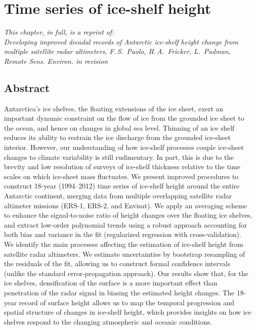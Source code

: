 %
%

\chapter{Time series of ice-shelf height}

{\sl
\noindent
This chapter, in full, is a reprint of:\\
Developing improved decadal records of Antarctic ice-shelf height change from multiple satellite radar altimeters, F.\,S.~Paolo, H.\,A.~Fricker, L.~Padman, {\rm Remote Sens. Environ.} in revision 
}


\section{Abstract}

Antarctica's ice shelves, the floating extensions of the ice sheet, exert an important dynamic constraint on the flow of ice from the grounded ice sheet to the ocean, and hence on changes in global sea level. Thinning of an ice shelf reduces its ability to restrain the ice discharge from the grounded ice-sheet interior. However, our understanding of how ice-shelf processes couple ice-sheet changes to climate variability is still rudimentary. In part, this is due to the brevity and low resolution of surveys of ice-shelf thickness relative to the time scales on which ice-sheet mass fluctuates. We present improved procedures to construct 18-year (1994--2012) time series of ice-shelf height around the entire Antarctic continent, merging data from multiple overlapping satellite radar altimeter missions (ERS-1, ERS-2, and Envisat). We apply an averaging scheme to enhance the signal-to-noise ratio of height changes over the floating ice shelves, and extract low-order polynomial trends using a robust approach accounting for both bias and variance in the fit (regularized regression with cross-validation). We identify the main processes affecting the estimation of ice-shelf height from satellite radar altimeters. We estimate uncertainties by bootstrap resampling of the residuals of the fit, allowing us to construct formal confidence intervals (unlike the standard error-propagation approach). Our results show that, for the ice shelves, densification of the surface is a more important effect than penetration of the radar signal in biasing the estimated height changes. The 18-year record of surface height allows us to map the temporal progression and spatial structure of changes in ice-shelf height, which provides insights on how ice shelves respond to the changing atmospheric and oceanic conditions.

